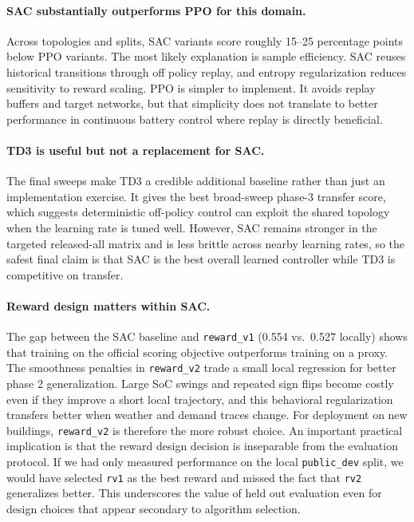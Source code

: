 \documentclass{article}
\begin{document}
\paragraph{SAC substantially outperforms PPO for this domain.} Across topologies and splits, SAC variants score roughly 15--25 percentage points below PPO variants. The most likely explanation is sample efficiency. SAC reuses historical transitions through off policy replay, and entropy regularization reduces sensitivity to reward scaling. PPO is simpler to implement. It avoids replay buffers and target networks, but that simplicity does not translate to better performance in continuous battery control where replay is directly beneficial.

\paragraph{TD3 is useful but not a replacement for SAC.} The final sweeps make TD3 a credible additional baseline rather than just an implementation exercise. It gives the best broad-sweep phase-3 transfer score, which suggests deterministic off-policy control can exploit the shared topology when the learning rate is tuned well. However, SAC remains stronger in the targeted released-all matrix and is less brittle across nearby learning rates, so the safest final claim is that SAC is the best overall learned controller while TD3 is competitive on transfer.

\paragraph{Reward design matters within SAC.} The gap between the SAC baseline and \texttt{reward\_v1} (0.554 vs.\ 0.527 locally) shows that training on the official scoring objective outperforms training on a proxy. The smoothness penalties in \texttt{reward\_v2} trade a small local regression for better phase 2 generalization. Large SoC swings and repeated sign flips become costly even if they improve a short local trajectory, and this behavioral regularization transfers better when weather and demand traces change. For deployment on new buildings, \texttt{reward\_v2} is therefore the more robust choice. An important practical implication is that the reward design decision is inseparable from the evaluation protocol. If we had only measured performance on the local \texttt{public\_dev} split, we would have selected \texttt{rv1} as the best reward and missed the fact that \texttt{rv2} generalizes better. This underscores the value of held out evaluation even for design choices that appear secondary to algorithm selection.
\end{document}

